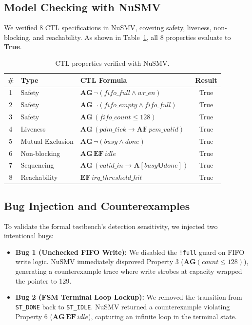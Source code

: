 \documentclass[11pt,a4paper]{article}
\begin{document}
\subsection{Model Checking with NuSMV}
We verified 8 CTL specifications in NuSMV, covering safety, liveness, non-blocking, and reachability. As shown in Table~\ref{tab:ctl}, all 8 properties evaluate to \textbf{True}.

\begin{table}[H]\centering\small
\caption{CTL properties verified with NuSMV.}\label{tab:ctl}
\begin{tabularx}{\linewidth}{@{}clXc@{}}
\toprule
\# & Type & CTL Formula & Result\\
\midrule
1 & Safety & $\mathbf{AG}\,\neg(\mathit{fifo\_full} \land \mathit{wr\_en})$ & True\\
2 & Safety & $\mathbf{AG}\,\neg(\mathit{fifo\_empty} \land \mathit{fifo\_full})$ & True\\
3 & Safety & $\mathbf{AG}\,(\mathit{fifo\_count} \le 128)$ & True\\
4 & Liveness & $\mathbf{AG}\,(\mathit{pdm\_tick} \rightarrow \mathbf{AF}\,\mathit{pcm\_valid})$ & True\\
5 & Mutual Exclusion & $\mathbf{AG}\,\neg(\mathit{busy} \land \mathit{done})$ & True\\
6 & Non-blocking & $\mathbf{AG}\,\mathbf{EF}\,\mathit{idle}$ & True\\
7 & Sequencing & $\mathbf{AG}\,(\mathit{valid\_in} \rightarrow \mathbf{A}[\mathit{busy} \mathbin{\mathbf{U}} \mathit{done}])$ & True\\
8 & Reachability & $\mathbf{EF}\,\mathit{irq\_threshold\_hit}$ & True\\
\bottomrule
\end{tabularx}
\end{table}

\subsection{Bug Injection and Counterexamples}
To validate the formal testbench's detection sensitivity, we injected two intentional bugs:
\begin{itemize}
  \item \textbf{Bug 1 (Unchecked FIFO Write):} We disabled the \texttt{!full} guard on FIFO write logic. NuSMV immediately disproved Property 3 ($\mathbf{AG}(\mathit{count} \le 128)$), generating a counterexample trace where write strobes at capacity wrapped the pointer to 129.
  \item \textbf{Bug 2 (FSM Terminal Loop Lockup):} We removed the transition from \texttt{ST\_DONE} back to \texttt{ST\_IDLE}. NuSMV returned a counterexample violating Property 6 ($\mathbf{AG}\,\mathbf{EF}\,\mathit{idle}$), capturing an infinite loop in the terminal state.
\end{itemize}
\end{document}
